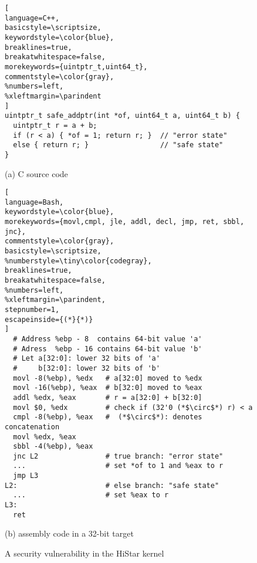 \begin{figure}
\begin{lstlisting}[
language=C++,
basicstyle=\scriptsize,
keywordstyle=\color{blue},
breaklines=true,
breakatwhitespace=false,
morekeywords={uintptr_t,uint64_t},
commentstyle=\color{gray},
%numbers=left,
%xleftmargin=\parindent
]
uintptr_t safe_addptr(int *of, uint64_t a, uint64_t b) {
  uintptr_t r = a + b;
  if (r < a) { *of = 1; return r; }  // "error state" 
  else { return r; }                 // "safe state" 
}
\end{lstlisting}
\vspace{-5pt}
\begin{center}
{\small (a) C source code}
\end{center}
\begin{lstlisting}[
language=Bash,
keywordstyle=\color{blue},
morekeywords={movl,cmpl, jle, addl, decl, jmp, ret, sbbl, jnc},
commentstyle=\color{gray},
basicstyle=\scriptsize,
%numberstyle=\tiny\color{codegray},
breaklines=true,
breakatwhitespace=false,
%numbers=left,
%xleftmargin=\parindent,
stepnumber=1,
escapeinside={(*}{*)}
]
  # Address %ebp - 8  contains 64-bit value 'a'  
  # Adress  %ebp - 16 contains 64-bit value 'b'
  # Let a[32:0]: lower 32 bits of 'a' 
  #     b[32:0]: lower 32 bits of 'b'
  movl -8(%ebp), %edx   # a[32:0] moved to %edx
  movl -16(%ebp), %eax  # b[32:0] moved to %eax
  addl %edx, %eax       # r = a[32:0] + b[32:0]
  movl $0, %edx         # check if (32'0 (*$\circ$*) r) < a
  cmpl -8(%ebp), %eax   #  (*$\circ$*): denotes concatenation
  movl %edx, %eax
  sbbl -4(%ebp), %eax
  jnc L2                # true branch: "error state"
  ...                   # set *of to 1 and %eax to r
  jmp L3
L2:                     # else branch: "safe state"
  ...                   # set %eax to r
L3:
  ret
\end{lstlisting}
\vspace{-5pt}
\begin{center}
{\small (b) \ISA assembly code in a 32-bit target}
\end{center}
\vspace*{-5pt}
\caption{A security vulnerability in the HiStar kernel}
\label{fig:histar}
\end{figure}

